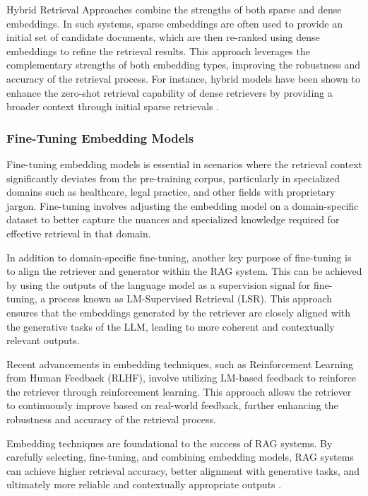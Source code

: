 Hybrid Retrieval Approaches combine the strengths of both sparse and dense embeddings. In such systems, sparse embeddings are often used to provide an initial set of candidate documents, which are then re-ranked using dense embeddings to refine the retrieval results. This approach leverages the complementary strengths of both embedding types, improving the robustness and accuracy of the retrieval process. For instance, hybrid models have been shown to enhance the zero-shot retrieval capability of dense retrievers by providing a broader context through initial sparse retrievals \cite{gao2023retrieval}.

\subsubsection{Fine-Tuning Embedding Models}

Fine-tuning embedding models is essential in scenarios where the retrieval context significantly deviates from the pre-training corpus, particularly in specialized domains such as healthcare, legal practice, and other fields with proprietary jargon. Fine-tuning involves adjusting the embedding model on a domain-specific dataset to better capture the nuances and specialized knowledge required for effective retrieval in that domain.

In addition to domain-specific fine-tuning, another key purpose of fine-tuning is to align the retriever and generator within the RAG system. This can be achieved by using the outputs of the language model as a supervision signal for fine-tuning, a process known as LM-Supervised Retrieval (LSR). This approach ensures that the embeddings generated by the retriever are closely aligned with the generative tasks of the LLM, leading to more coherent and contextually relevant outputs.

Recent advancements in embedding techniques, such as Reinforcement Learning from Human Feedback (RLHF), involve utilizing LM-based feedback to reinforce the retriever through reinforcement learning. This approach allows the retriever to continuously improve based on real-world feedback, further enhancing the robustness and accuracy of the retrieval process.

Embedding techniques are foundational to the success of RAG systems. By carefully selecting, fine-tuning, and combining embedding models, RAG systems can achieve higher retrieval accuracy, better alignment with generative tasks, and ultimately more reliable and contextually appropriate outputs \cite{gao2023retrieval}.

